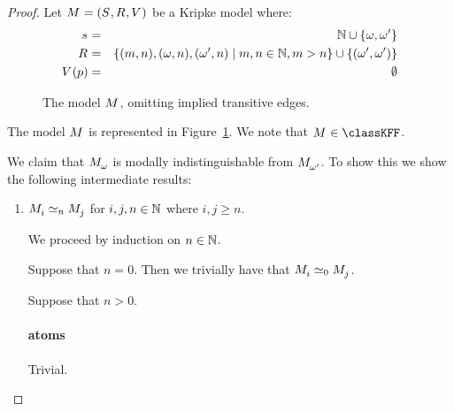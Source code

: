 \begin{proof}
Let $\kModelAndTuple$ be a Kripke model where:
\begin{eqnarray*}
\kStateS &=& \naturals \cup \{\omega, \omega'\}\\
\kAccessibility{} &=& \{(m, n), (\omega, n), (\omega', n) \mid m, n \in \naturals, m > n\} \cup \{(\omega', \omega')\}\\
\kValuation(\atomP) &=& \emptyset
\end{eqnarray*}

\begin{figure}
    \centering
    \caption{The model $\kModel$, omitting implied transitive edges.}\label{model-naturals}
\end{figure}

The model $\kModel$ is represented in Figure~\ref{model-naturals}.
We note that $\kModel \in \classKFF$.

We claim that $\kPModel{\omega}$ is modally indistinguishable from $\kPModel{\omega'}$.
To show this we show the following intermediate results:
\begin{enumerate}
    \item $\kPModel{i} \bisimilar[n] \kPModel{j}$ for $i, j, n \in \mathbb{N}$ where $i, j \geq n$.

        We proceed by induction on $n \in \mathbb{N}$.

        Suppose that $n = 0$. Then we trivially have that $\kPModel{i} \bisimilar[0] \kPModel{j}$.

        Suppose that $n > 0$.

        \paragraph{atoms} Trivial.


\end{enumerate}
\end{proof}
